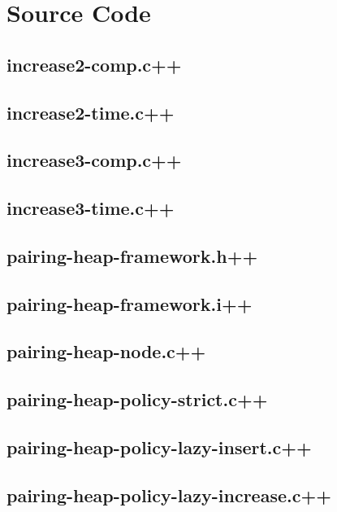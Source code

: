 \documentclass{DIKU-article}[2010/01/13]
\begin{document}
\clearpage


\section{Source Code}
\subsection{increase2-comp.c++}


\subsection{increase2-time.c++}


\subsection{increase3-comp.c++}


\subsection{increase3-time.c++}


\subsection{pairing-heap-framework.h++}


\subsection{pairing-heap-framework.i++}


\subsection{pairing-heap-node.c++}


\subsection{pairing-heap-policy-strict.c++}


\subsection{pairing-heap-policy-lazy-insert.c++}


\subsection{pairing-heap-policy-lazy-increase.c++}

\end{document}
